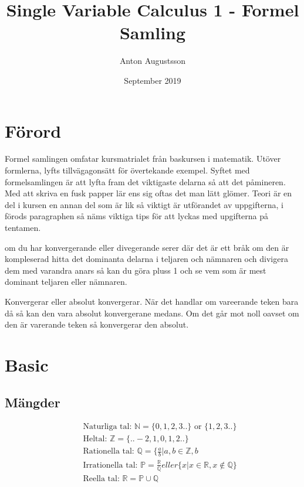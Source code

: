 \documentclass{article}
\title{Single Variable Calculus 1 - Formel Samling}
\author{Anton Augustsson}
\date{September 2019}
\begin{document}
\maketitle

\newpage
\tableofcontents
\newpage

\section{Förord}
Formel samlingen omfatar kursmatrialet från baskursen i matematik. Utöver formlerna, lyfts tillvägagonsätt
för övertekande exempel. Syftet med formelsamlingen är att lyfta fram det viktigaste delarna så att det
påmineren. Med att skriva en fusk papper lär ens sig oftas det man lätt glömer. Teori är en del i kursen
en annan del som är lik så viktigt är utförandet av uppgifterna, i förods paragraphen så näms viktiga tips
för att lyckas med upgifterna på tentamen.

om du har konvergerande eller divegerande serer där det är ett bråk om den är kompleserad hitta det dominanta delarna i teljaren och nämnaren och divigera dem med varandra anars så kan du göra pluss 1 och se vem som är mest dominant teljaren eller nämnaren.

Konvergerar eller absolut konvergerar. När det handlar om vareerande teken bara då så kan den vara absolut konvergerane medans. Om det går mot noll oavset om den är varerande teken så konvergerar den absolut.

\newpage


\section{Basic}
\subsection{Mängder}
\begin{align*}
  &\quad \text{Naturliga tal: } \mathbb{N} = \{0, 1, 2 , 3 ..  \} \text{ or } \{1, 2 , 3 ..  \} \\
  &\quad \text{Heltal: }\mathbb{Z} = \{.. -2, 1, 0, 1, 2 ..  \} \\
  &\quad \text{Rationella tal: }\mathbb{Q} = \{ \frac{a}{b} | a,b \in \mathbb{Z}, b \\
  &\quad \text{Irrationella tal: }\mathbb{P} = \frac{\mathbb{R}}{\mathbb{Q}}eller \{ x | x \in \mathbb{R}, x \notin \mathbb{Q} \} \\
  &\quad \text{Reella tal: }\mathbb{R} =  \mathbb{P} \cup \mathbb{Q} \\
\end{align*}
\end{document}
